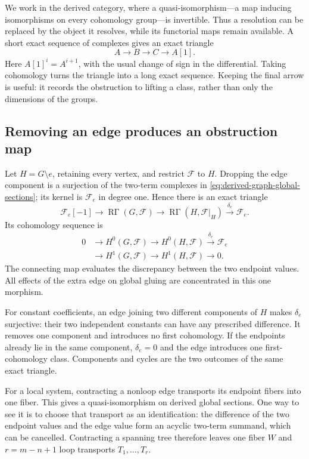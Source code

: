 \documentclass[11pt]{article}
\theoremstyle{definition}
\theoremstyle{remark}
\begin{document}
We work in the derived category, where a quasi-isomorphism---a map inducing isomorphisms on every cohomology group---is invertible. Thus a resolution can be replaced by the object it resolves, while its functorial maps remain available. A short exact sequence of complexes gives an exact triangle
\[
 A\longrightarrow B\longrightarrow C\longrightarrow A[1].
\]
Here $A[1]^i=A^{i+1}$, with the usual change of sign in the differential. Taking cohomology turns the triangle into a long exact sequence. Keeping the final arrow is useful: it records the obstruction to lifting a class, rather than only the dimensions of the groups.

\subsection{Removing an edge produces an obstruction map}

Let $H=G\setminus e$, retaining every vertex, and restrict $\mathcal F$ to $H$. Dropping the edge component is a surjection of the two-term complexes in \eqref{eq:derived-graph-global-sections}; its kernel is $\mathcal F_e$ in degree one. Hence there is an exact triangle
\begin{equation}\label{eq:derived-edge-triangle}
 \mathcal F_e[-1]\longrightarrow\operatorname{R\Gamma}(G,\mathcal F)
 \longrightarrow\operatorname{R\Gamma}(H,\mathcal F|_H)
 \xrightarrow{\delta_e}\mathcal F_e.
\end{equation}
Its cohomology sequence is
\[
 \begin{aligned}
 0&\longrightarrow H^0(G,\mathcal F)\longrightarrow H^0(H,\mathcal F)
 \xrightarrow{\delta_e}\mathcal F_e\\
 &\longrightarrow H^1(G,\mathcal F)\longrightarrow H^1(H,\mathcal F)
 \longrightarrow0.
 \end{aligned}
\]
The connecting map evaluates the discrepancy between the two endpoint values. All effects of the extra edge on global gluing are concentrated in this one morphism.

For constant coefficients, an edge joining two different components of $H$ makes $\delta_e$ surjective: their two independent constants can have any prescribed difference. It removes one component and introduces no first cohomology. If the endpoints already lie in the same component, $\delta_e=0$ and the edge introduces one first-cohomology class. Components and cycles are the two outcomes of the same exact triangle.

For a local system, contracting a nonloop edge transports its endpoint fibers into one fiber. This gives a quasi-isomorphism on derived global sections. One way to see it is to choose that transport as an identification: the difference of the two endpoint values and the edge value form an acyclic two-term summand, which can be cancelled. Contracting a spanning tree therefore leaves one fiber $W$ and $r=m-n+1$ loop transports $T_1,\ldots,T_r$.
\end{document}
